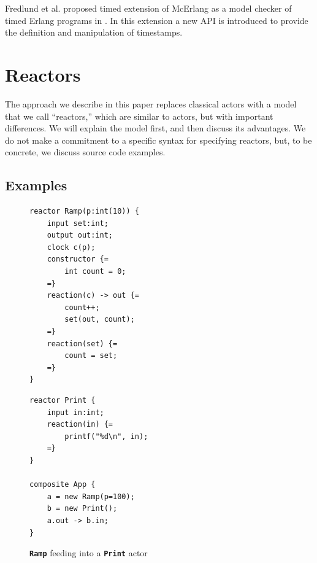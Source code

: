 \documentclass[sigconf]{acmart}
\newcommand{\todo}[1]{\mynote{TODO}{#1}{red}}
\newcommand{\keyword}[1]{\texttt{\textbf{#1}}}
\begin{document}
Fredlund et al. proposed timed extension of McErlang
as a model checker of timed Erlang programs in \cite{DBLP:conf/forte/EarleF12}. In this extension a new API is introduced to provide the definition and manipulation of timestamps.


\section{Reactors}

The approach we describe in this paper replaces classical actors with a model that we call ``reactors,''
which are similar to actors, but with important differences.
We will explain the model first, and then discuss its advantages.
We do not make a commitment to a specific syntax for specifying reactors,
but, to be concrete, we discuss source code examples.


\subsection{Examples}
\begin{figure}[ht]
\centering
\begin{minipage}{0.50\linewidth} %
\begin{lstlisting}[language=LF]
reactor Ramp(p:int(10)) {
	input set:int;
	output out:int;
	clock c(p);
	constructor {=
		int count = 0;
	=}
	reaction(c) -> out {=
		count++;
		set(out, count);
	=}
	reaction(set) {=
		count = set;
	=}
}
\end{lstlisting}
\end{minipage}%
\begin{minipage}{0.45\linewidth}
\begin{lstlisting}[language=LF,firstnumber=13]
reactor Print {
	input in:int;
	reaction(in) {=
		printf("%d\n", in);
	=}
}

composite App {
	a = new Ramp(p=100);
	b = new Print();
	a.out -> b.in;
}
\end{lstlisting}
\end{minipage}
 \caption{\keyword{Ramp} feeding into a \keyword{Print} actor}
 \label{fig:code}
\end{figure}
\end{document}
